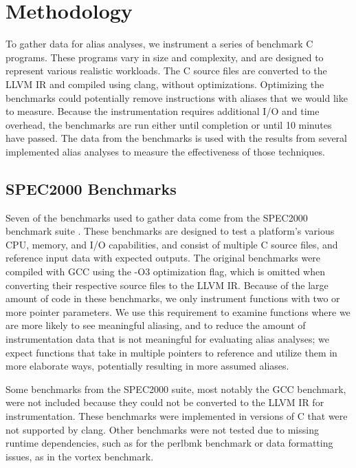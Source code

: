 \chapter{Methodology}

To gather data for alias analyses, we instrument a series of benchmark C programs. These programs vary in size and complexity, and are designed to represent various realistic workloads. The C source files are converted to the LLVM IR and compiled using clang, without optimizations. Optimizing the benchmarks could potentially remove instructions with aliases that we would like to measure. Because the instrumentation requires additional I/O and time overhead, the benchmarks are run either until completion or until 10 minutes have passed. The data from the benchmarks is used with the results from several implemented alias analyses to measure the effectiveness of those techniques.

\section{SPEC2000 Benchmarks}
Seven of the benchmarks used to gather data come from the SPEC2000 benchmark suite \cite{spec2000}. These benchmarks are designed to test a platform's various CPU, memory, and I/O capabilities, and consist of multiple C source files, and reference input data with expected outputs. The original benchmarks were compiled with GCC using the -O3 optimization flag, which is omitted when converting their respective source files to the LLVM IR. Because of the large amount of code in these benchmarks, we only instrument functions with two or more pointer parameters. We use this requirement to examine functions where we are more likely to see meaningful aliasing, and to reduce the amount of instrumentation data that is not meaningful for evaluating alias analyses; we expect functions that take in multiple pointers to reference and utilize them in more elaborate ways, potentially resulting in more assumed aliases.

Some benchmarks from the SPEC2000 suite, most notably the GCC benchmark, were not included because they could not be converted to the LLVM IR for instrumentation. These benchmarks were implemented in versions of C that were not supported by clang. Other benchmarks were not tested due to missing runtime dependencies, such as for the perlbmk benchmark or data formatting issues, as in the vortex benchmark.

